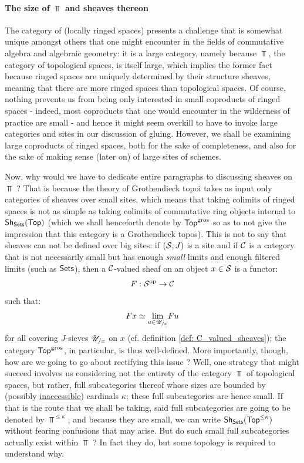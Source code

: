                 \paragraph{The size of \texorpdfstring{$\Top$}{} and sheaves thereon}
                    The category of (locally ringed spaces) presents a challenge that is somewhat unique amongst others that one might encounter in the fields of commutative algebra and algebraic geometry: it is a large category, namely because $\Top$, the category of topological spaces, is itself large, which implies the former fact because ringed spaces are uniquely determined by their structure sheaves, meaning that there are more ringed spaces than topological spaces. Of course, nothing prevents us from being only interested in small coproducts of ringed spaces - indeed, most coproducts that one would encounter in the wilderness of practice are small - and hence it might seem overkill to have to invoke large categories and sites in our discussion of gluing. However, we shall be examining large coproducts of ringed spaces, both for the sake of completeness, and also for the sake of making sense (later on) of large sites of schemes. 
                    
                    Now, why would we have to dedicate entire paragraphs to discussing sheaves on $\Top$ ? That is because the theory of Grothendieck topoi takes as input only categories of sheaves over small sites, which means that taking colimits of ringed spaces is not as simple as taking colimits of commutative ring objects internal to $\Sh_{\Sets}(\Top)$ (which we shall henceforth denote by $\Top^{\gros}$ so as to not give the impression that this category is a Grothendieck topos). This is not to say that sheaves can not be defined over big sites: if $(\S, J)$ is a site and if $\C$ is a category that is not necessarily small but has enough \textit{small} limits and enough filtered limits (such as $\Sets$), then a $\C$-valued sheaf on an object $x \in \S$ is a functor:
                        $$F: \S^{\op} \to \C$$
                    such that:
                        $$Fx \cong \underset{u \in \U_{/x}}{\lim} Fu$$
                    for all covering $J$-sieves $\U_{/x}$ on $x$ (cf. definition \ref{def: C_valued_sheaves}); the category $\Top^{\gros}$, in particular, is thus well-defined. More importantly, though, how are we going to go about rectifying this issue ? Well, one strategy that might succeed involves us considering not the entirety of the category $\Top$ of topological spaces, but rather, full subcategories thereof whose sizes are bounded by (possibly \href{https://ncatlab.org/nlab/show/inaccessible+cardinal}{\underline{inaccessible}}) cardinals $\kappa$; these full subcategories are hence small. If that is the route that we shall be taking, said full subcategories are going to be denoted by $\Top^{\leq \kappa}$, and because they are small, we can write $\Sh_{\Sets}(\Top^{\leq \kappa})$ without fearing confusions that may arise. But do such small full subcategories actually exist within $\Top$ ? In fact they do, but some topology is required to understand why.
                    
